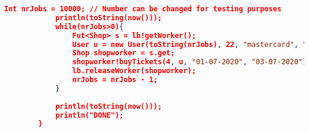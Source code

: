 \documentclass[10pt,a4paper,twocolumn]{article}
\begin{document}
\begin{appendices}
\begin{lstlisting}[language=json]
			Int nrJobs = 10000;	// Number can be changed for testing purposes
			println(toString(now()));
			while(nrJobs>0){
				Fut<Shop> s = lb!getWorker();
				User u = new User(toString(nrJobs), 22, "mastercard", "email", kv);
				Shop shopworker = s.get;
				shopworker!buyTickets(4, u, "01-07-2020", "03-07-2020");
				lb.releaseWorker(shopworker);
				nrJobs = nrJobs - 1;
			} 
			
			println(toString(now())); 
			println("DONE");
		}
	\end{lstlisting}
	
\end{appendices}
\end{document}

